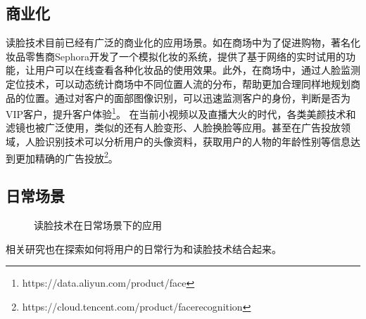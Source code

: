 \subsection{商业化}
读脸技术目前已经有广泛的商业化的应用场景。如在商场中为了促进购物，著名化妆品零售商Sephora开发了一个模拟化妆的系统，提供了基于网络的实时试用的功能，让用户可以在线查看各种化妆品的使用效果\cite{Sephora}。此外，在商场中，通过人脸监测定位技术，可以动态统计商场中不同位置人流的分布，帮助更加合理同样地规划商品的位置。通过对客户的面部图像识别，可以迅速监测客户的身份，判断是否为VIP客户，提升客户体验\footnote{https://data.aliyun.com/product/face}。
在当前小视频以及直播大火的时代，各类美颜技术和滤镜也被广泛使用，类似的还有人脸变形、人脸换脸等应用。甚至在广告投放领域，人脸识别技术可以分析用户的头像资料，获取用户的人物的年龄性别等信息达到更加精确的广告投放\footnote{https://cloud.tencent.com/product/facerecognition}。

\subsection{日常场景}
\begin{figure}[h]
    \centering
    \caption{读脸技术在日常场景下的应用}
    \label{fig:smile}
\end{figure}
相关研究也在探索如何将用户的日常行为和读脸技术结合起来。

